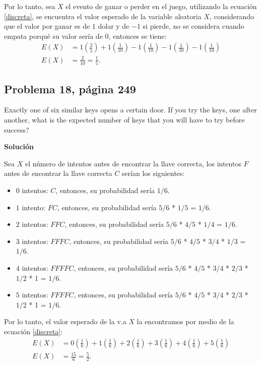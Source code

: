 \documentclass{article}
\begin{document}
\noindent Por lo tanto, sea $X$ el evento de ganar o perder en el juego, utilizando la ecuación \ref{discreta}, se encuentra el valor esperado de la variable aleatoria $X$, considerando que el valor por ganar es de $1$ dolar y de $-1$ si pierde, no se considera cuando empata porqué su valor sería de $0$, entonces se tiene:
\begin{align}
    \nonumber
    E{(X)}  & = 1\left(\frac{2}{5}\right) + 1\left(\frac{1}{10}\right) - 1\left(\frac{1}{10} \right) - 1\left(\frac{1}{10} \right) - 1\left(\frac{1}{10} \right) \\ \nonumber
    E{(X)}  & = \frac{2}{10} = \frac{1}{5}. 
\end{align}

\subsection{Problema 18, página 249}
Exactly one of six similar keys opens a certain door. If you try the keys, one after another, what is the expected number of keys that you will have to try before success?

\noindent \textbf{Solución}

\noindent Sea $X$ el número de intentos antes de encontrar la llave correcta, los intentos $F$ antes de encontrar la llave correcta $C$ serían los siguientes:

\begin{itemize}
    \item $0$ intentos: $C$, entonces, su probabilidad sería $1/6$.
    \item $1$ intento: $FC$, entonces, su probabilidad sería $5/6$ * $1/5$ = $1/6$.
    \item $2$ intentos: $FFC$, entonces, su probabilidad sería $5/6$ * $4/5$ * $1/4$ = $1/6$.
    \item $3$ intentos: $FFFC$, entonces, su probabilidad sería $5/6$ * $4/5$ * $3/4$ * $1/3$ = $1/6$.
    \item $4$ intentos: $FFFFC$, entonces, su probabilidad sería $5/6$ * $4/5$ * $3/4$ * $2/3$ * $1/2$ * 1 = $1/6$.
    \item $5$ intentos: $FFFFC$, entonces, su probabilidad sería $5/6$ * $4/5$ * $3/4$ * $2/3$ * $1/2$ * 1 = $1/6$.
\end{itemize}
Por lo tanto, el valor esperado de la v.a $X$ la encontramos por medio de la ecuación \ref{discreta}:
\begin{align}
    \nonumber
    E{(X)}  & = 0\left(\frac{1}{6}\right) + 1\left(\frac{1}{6}\right) + 2\left(\frac{1}{6}\right) + 3\left(\frac{1}{6}\right) + 4\left(\frac{1}{6}\right) + 5\left(\frac{1}{6}\right) \\ \nonumber
    E{(X)}  & = \frac{15}{6} = \frac{5}{2}.
\end{align}
\end{document}
